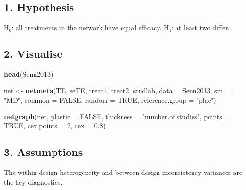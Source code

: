 \documentclass[
]{article}
\newenvironment{Shaded}{\begin{snugshade}}{\end{snugshade}}
\newcommand{\AttributeTok}[1]{\textcolor[rgb]{0.13,0.29,0.53}{#1}}
\newcommand{\ConstantTok}[1]{\textcolor[rgb]{0.56,0.35,0.01}{#1}}
\newcommand{\DecValTok}[1]{\textcolor[rgb]{0.00,0.00,0.81}{#1}}
\newcommand{\FloatTok}[1]{\textcolor[rgb]{0.00,0.00,0.81}{#1}}
\newcommand{\FunctionTok}[1]{\textcolor[rgb]{0.13,0.29,0.53}{\textbf{#1}}}
\newcommand{\NormalTok}[1]{#1}
\newcommand{\OtherTok}[1]{\textcolor[rgb]{0.56,0.35,0.01}{#1}}
\newcommand{\StringTok}[1]{\textcolor[rgb]{0.31,0.60,0.02}{#1}}
\begin{document}
\subsection{1. Hypothesis}\label{hypothesis}

H₀: all treatments in the network have equal efficacy. H₁: at least two
differ.

\subsection{2. Visualise}\label{visualise}

\begin{Shaded}
\begin{Highlighting}[]
\FunctionTok{head}\NormalTok{(Senn2013)}

\NormalTok{net }\OtherTok{\textless{}{-}} \FunctionTok{netmeta}\NormalTok{(TE, seTE, treat1, treat2, studlab,}
               \AttributeTok{data =}\NormalTok{ Senn2013, }\AttributeTok{sm =} \StringTok{"MD"}\NormalTok{,}
               \AttributeTok{common =} \ConstantTok{FALSE}\NormalTok{, }\AttributeTok{random =} \ConstantTok{TRUE}\NormalTok{,}
               \AttributeTok{reference.group =} \StringTok{"plac"}\NormalTok{)}
\end{Highlighting}
\end{Shaded}

\begin{Shaded}
\begin{Highlighting}[]
\FunctionTok{netgraph}\NormalTok{(net, }\AttributeTok{plastic =} \ConstantTok{FALSE}\NormalTok{, }\AttributeTok{thickness =} \StringTok{"number.of.studies"}\NormalTok{,}
         \AttributeTok{points =} \ConstantTok{TRUE}\NormalTok{, }\AttributeTok{cex.points =} \DecValTok{2}\NormalTok{, }\AttributeTok{cex =} \FloatTok{0.8}\NormalTok{)}
\end{Highlighting}
\end{Shaded}

\subsection{3. Assumptions}\label{assumptions}

\begin{Shaded}
\begin{Highlighting}[]

\end{Highlighting}
\end{Shaded}

The within-design heterogeneity and between-design inconsistency
variances are the key diagnostics.
\end{document}
